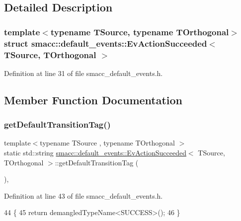 \subsection{Detailed Description}
\subsubsection*{template$<$typename T\+Source, typename T\+Orthogonal$>$\newline
struct smacc\+::default\+\_\+events\+::\+Ev\+Action\+Succeeded$<$ T\+Source, T\+Orthogonal $>$}



Definition at line 31 of file smacc\+\_\+default\+\_\+events.\+h.



\subsection{Member Function Documentation}
\mbox{\label{structsmacc_1_1default__events_1_1EvActionSucceeded_a3efa02ebbf17f0775bec92650af7ef58}} 
\subsubsection{\texorpdfstring{get\+Default\+Transition\+Tag()}{getDefaultTransitionTag()}}
{\footnotesize\ttfamily template$<$typename T\+Source , typename T\+Orthogonal $>$ \\
static std\+::string \hyperlink{structsmacc_1_1default__events_1_1EvActionSucceeded}{smacc\+::default\+\_\+events\+::\+Ev\+Action\+Succeeded}$<$ T\+Source, T\+Orthogonal $>$\+::get\+Default\+Transition\+Tag (\begin{DoxyParamCaption}{ }\end{DoxyParamCaption})\hspace{0.3cm}{\ttfamily [inline]}, {\ttfamily [static]}}



Definition at line 43 of file smacc\+\_\+default\+\_\+events.\+h.


\begin{DoxyCode}
44   \{
45     \textcolor{keywordflow}{return} demangledTypeName<SUCCESS>();
46   \}
\end{DoxyCode}
\mbox{\label{structsmacc_1_1default__events_1_1EvActionSucceeded_ac96046bba5fce1111a9410b5d02089c4}} 
